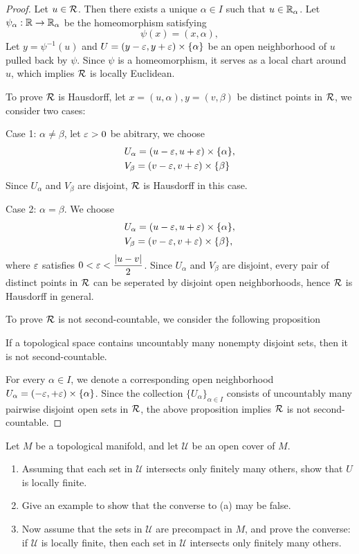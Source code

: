 \begin{proof}
    Let $u \in \mathcal{R}$. Then there exists a unique $\alpha \in I$ such that  $u \in \mathbb{R}_{\alpha}$. Let $\psi_\alpha: \mathbb{R} \to \mathbb{R}_{\alpha}$ be the homeomorphism satisfying
    \[
        \psi(x) = (x,\alpha),
    \]
     Let $y = \psi^{-1}(u)$ and $U = (y - \varepsilon, y + \varepsilon) \times\{\alpha\}$ be an open neighborhood of $u$ pulled back by $\psi$. Since $\psi$ is a homeomorphism, it serves as a local chart around $u$, which implies $\mathcal{R}$ is locally Euclidean.

     To prove $\mathcal{R}$ is Hausdorff, let $x = (u,\alpha),y= (v,\beta)$ be distinct points in $\mathcal{R}$, we consider two cases:

     Case 1: $\alpha \neq \beta$, let $\varepsilon > 0$ be abitrary, we choose 
     \begin{align*}
        &U_\alpha = (u - \varepsilon, u + \varepsilon) \times\{\alpha\},\\
        &V_{\beta} = (v- \varepsilon, v + \varepsilon) \times\{\beta\}
     \end{align*}
     Since $U_{\alpha}$ and $V_{\beta}$ are disjoint, $\mathcal{R}$ is Hausdorff in this case.

     Case 2: $\alpha = \beta$. We choose
    \begin{align*}
        &U_\alpha = \left(u - \varepsilon, u + \varepsilon\right) \times\{\alpha\},\\
        &V_{\beta} = \left(v- \varepsilon, v + \varepsilon\right) \times\{\beta\},
     \end{align*}
     where $\varepsilon$ satisfies $0 < \varepsilon < \dfrac{|u - v|}{2}$. Since $U_{\alpha}$ and $V_{\beta}$ are disjoint, every pair of distinct points in $\mathcal{R}$ can be seperated by disjoint open neighborhoods, hence $\mathcal{R}$ is Hausdorff in general.

    To prove $\mathcal{R}$ is not second-countable, we consider the following proposition
    \begin{proposition}
        If a topological space contains uncountably many nonempty disjoint sets, then it is not second-countable.
    \end{proposition}
    For every $\alpha \in I$, we denote a corresponding open neighborhood $U_{\alpha} = (-\varepsilon,+\varepsilon) \times \{\alpha\}$. Since the collection $\{U_{\alpha}\}_{\alpha \in I}$ consists of uncountably many pairwise disjoint open sets in $\mathcal{R}$, the above proposition implies $\mathcal{R}$ is not second-countable.
\end{proof}
\begin{problem}
    Let $M$ be a topological manifold, and let $\mathcal{U}$ be an open cover of $M$.
    \begin{enumerate}
        \item Assuming that each set in $\mathcal{U}$ intersects only finitely many others, show that $U$ is locally finite.
        \item Give an example to show that the converse to (a) may be false.
        \item Now assume that the sets in $\mathcal{U}$ are precompact in $M$, and prove the converse: if $\mathcal{U}$ is locally finite, then each set in $\mathcal{U}$ intersects only finitely many others.
    \end{enumerate}
\end{problem}
